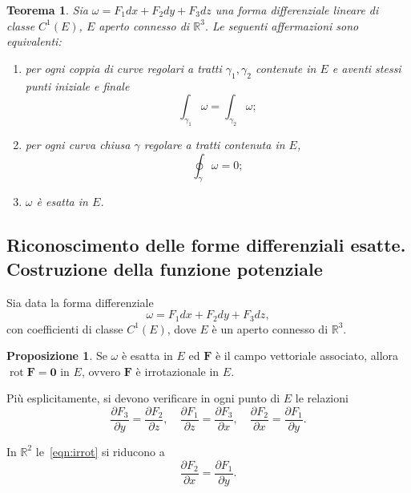\documentclass[a4paper]{book}
\DeclareMathOperator{\rot}{rot}
\numberwithin{equation}{section}
\theoremstyle{plain}
\newtheorem{teor}{Teorema}[section]
\theoremstyle{definition}
\newtheorem{prop}{Proposizione}[section]
\theoremstyle{remark}
\renewcommand{\vec}{\boldsymbol}
\theoremstyle{example}
\begin{document}
\begin{teor}
	Sia $\omega = F_1dx + F_2dy + F_3dz$ una forma differenziale lineare di classe $C^1(E)$, $E$ aperto connesso di $\mathbb{R}^3$. Le seguenti affermazioni sono equivalenti:
	\begin{enumerate}
		\item per ogni coppia di curve regolari a tratti $\gamma_1, \gamma_2$ contenute in $E$ e aventi stessi punti iniziale e finale
		\begin{equation*}
			\int_{\gamma_1}\omega = \int_{\gamma_2}\omega;
		\end{equation*}
		\item per ogni curva chiusa $\gamma$ regolare a tratti contenuta in $E$,
		\begin{equation*}
			\oint_{\gamma} \omega = 0;
		\end{equation*}
		\item $\omega$ è esatta in $E$.
	\end{enumerate}
\end{teor}

\subsection{Riconoscimento delle forme differenziali esatte. Costruzione della funzione potenziale}
Sia data la forma differenziale
\begin{equation*}
	\omega = F_1dx + F_2 dy + F_3dz,
\end{equation*}
con coefficienti di classe $C^1(E)$, dove $E$ è un aperto connesso di $\mathbb{R}^3$.

\begin{prop}
	Se $\omega$ è esatta in $E$ ed $\vec{F}$ è il campo vettoriale associato, allora $\rot{\vec{F}} = \vec{0}$ in $E$, ovvero $\vec{F}$ è irrotazionale in $E$.
\end{prop}

Più esplicitamente, si devono verificare in ogni punto di $E$ le relazioni
\begin{equation}
	\label{eqn:irrot}
	\frac{\partial F_3}{\partial y} = \frac{\partial F_2}{\partial z}, \quad \frac{\partial F_1}{\partial z} = \frac{\partial F_3}{\partial x}, \quad \frac{\partial F_2}{\partial x} = \frac{\partial F_1}{\partial y}.
\end{equation}

In $\mathbb{R}^2$ le~\eqref{eqn:irrot} si riducono a
\begin{equation}
	\frac{\partial F_2}{\partial x} = \frac{\partial F_1}{\partial y}.
\end{equation}
\end{document}
